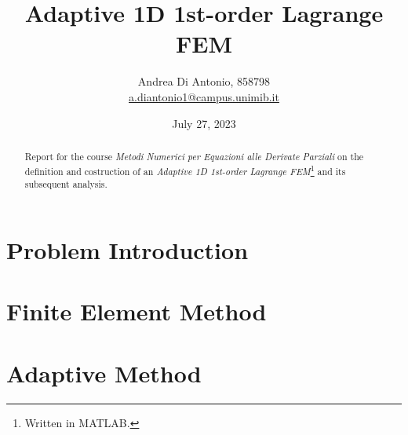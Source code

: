\documentclass[12pt]{article}
\title{Adaptive 1D 1st-order Lagrange FEM}
\author{Andrea Di Antonio, 858798 \\ \hyperlink{mailto:a.diantonio1@campus.unimib.it}{a.diantonio1@campus.unimib.it}}
\date{July 27, 2023}
\begin{document}
	\maketitle
	\thispagestyle{fancy}
	
	\begin{abstract}
		\begin{center}
            Report for the course \textit{Metodi Numerici per Equazioni alle Derivate Parziali} on the definition and costruction of an \textit{Adaptive 1D 1st-order Lagrange FEM}\footnote{Written in MATLAB.} and its subsequent analysis.
        \end{center}
	\end{abstract}

    \tableofcontents
    
    \newpage
    \section{Problem Introduction}
    

    \newpage
    \section{Finite Element Method}

    \newpage
    \section{Adaptive Method}
\end{document}
